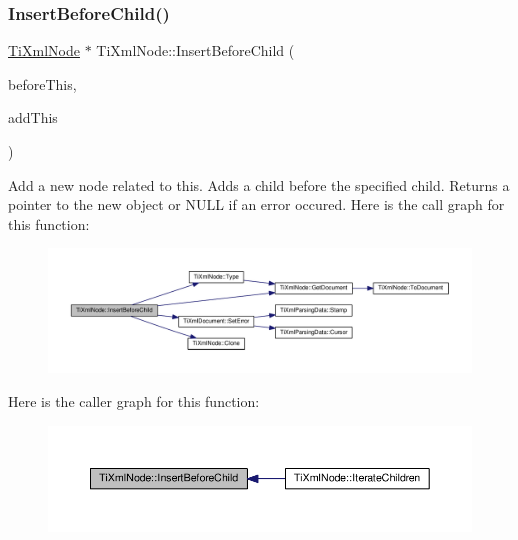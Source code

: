 \subsubsection{\texorpdfstring{Insert\+Before\+Child()}{InsertBeforeChild()}}
{\footnotesize\ttfamily \hyperlink{class_ti_xml_node}{Ti\+Xml\+Node} $\ast$ Ti\+Xml\+Node\+::\+Insert\+Before\+Child (\begin{DoxyParamCaption}\item[{\hyperlink{class_ti_xml_node}{Ti\+Xml\+Node} $\ast$}]{before\+This,  }\item[{const \hyperlink{class_ti_xml_node}{Ti\+Xml\+Node} \&}]{add\+This }\end{DoxyParamCaption})}

Add a new node related to this. Adds a child before the specified child. Returns a pointer to the new object or N\+U\+LL if an error occured. Here is the call graph for this function\+:
\nopagebreak
\begin{figure}[H]
\begin{center}
\leavevmode
\includegraphics[width=350pt]{class_ti_xml_node_a71e54e393336382bc9875f64aab5cb15_cgraph}
\end{center}
\end{figure}
Here is the caller graph for this function\+:
\nopagebreak
\begin{figure}[H]
\begin{center}
\leavevmode
\includegraphics[width=350pt]{class_ti_xml_node_a71e54e393336382bc9875f64aab5cb15_icgraph}
\end{center}
\end{figure}
\mbox{\label{class_ti_xml_node_af287a913ce46d8dbf7ef24fec69bbaf0}} 
